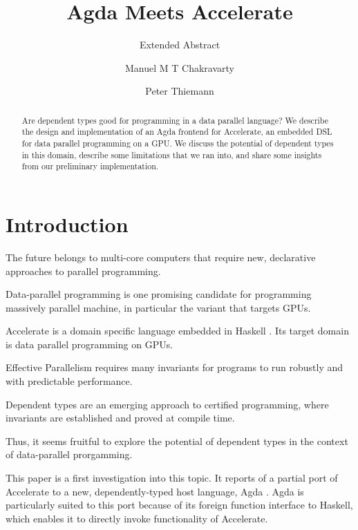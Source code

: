 \documentclass{llncs}
\begin{document}
%
\title{Agda Meets Accelerate}
\subtitle{Extended Abstract}
\author{Manuel M T Chakravarty \and Peter Thiemann}

\maketitle              %

\begin{abstract}
  Are dependent types good for programming in a data parallel
  language?
  We describe the design and implementation of an Agda frontend for
  Accelerate, an embedded DSL for data parallel programming on a
  GPU. We discuss the potential of dependent types in this domain,
  describe some limitations that we ran into, and share some insights
  from our preliminary implementation.
\end{abstract}
\thispagestyle{plain}
\pagestyle{plain}
%
\section{Introduction}
\label{sec:introduction}

The future belongs to multi-core computers that require new,
declarative approaches to parallel programming. 

Data-parallel programming is one promising candidate for programming
massively parallel machine, in particular the variant that targets
GPUs.

Accelerate \cite{ChakravartyKellerLeeMcdonellGrover2011} is a domain
specific language embedded in Haskell \cite{PeytonJones2003}. Its
target domain is data parallel programming on GPUs.

Effective Parallelism requires many invariants for programs to
run robustly and with predictable performance.

Dependent types are an emerging approach to certified programming,
where invariants are established and proved at compile time.

Thus, it seems fruitful to explore the potential of dependent types in
the context of data-parallel prorgamming.

This paper is a first investigation into this topic. It reports of a
partial port of Accelerate to a new, dependently-typed host language,
Agda \cite{Norell2008,BoveDybjerNorell2009}. Agda is particularly
suited to this port because of its foreign function interface to
Haskell, which enables it to directly invoke functionality of
Accelerate. 
\end{document}
